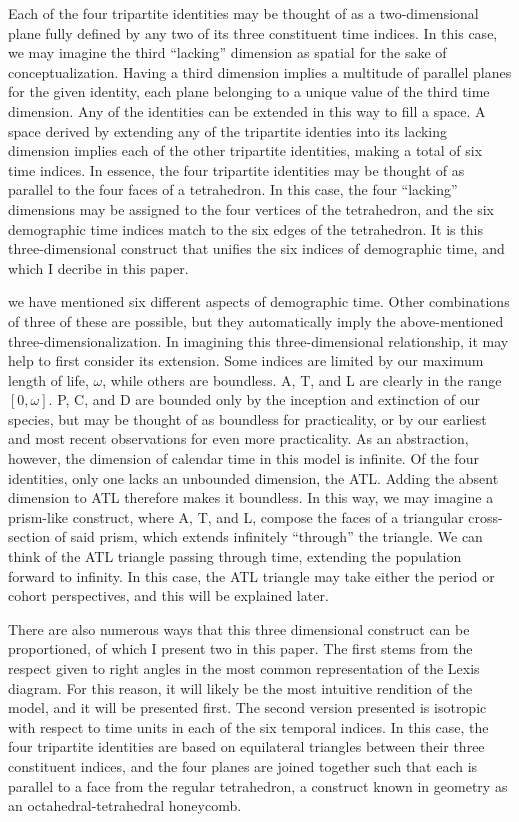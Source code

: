 \documentclass[11pt,oneside]{article} %
\begin{document}
Each of the four tripartite identities may be thought of as a
two-dimensional plane fully defined by any two of its three constituent time
indices.
In this case, we may imagine the third ``lacking'' dimension as spatial for the sake of conceptualization.
Having a third dimension implies a multitude of parallel planes for the given identity, each plane
belonging to a unique value of the third time dimension. Any of the
identities can be extended in this way to fill a space. A space derived by
extending any of the tripartite identies into its lacking dimension implies each of the
other tripartite identities, making a total of six time indices. In essence, the
four tripartite identities may be thought of as parallel to the four faces of a
tetrahedron. In this case, the four ``lacking'' dimensions may be assigned to
the four vertices of the tetrahedron, and the six demographic time indices match
to the six edges of the tetrahedron. It is this three-dimensional construct that
unifies the six indices of demographic time, and which I decribe in this
paper.

we have mentioned six different aspects of demographic time. Other combinations
of three of these are possible, but they automatically imply the above-mentioned
three-dimensionalization. In imagining this three-dimensional relationship,
it may help to first consider its extension. Some indices are limited
by our maximum length of life, $\omega$, while others are boundless. A, T, and L are clearly in the range $[0,\omega]$. P, C, and D are bounded only by the inception and extinction of our species, but may be
thought of as boundless for practicality, or by our earliest and most recent
observations for even more practicality. As an abstraction, however, the
dimension of calendar time in this model is infinite. Of the four identities,
only one lacks an unbounded dimension, the ATL. Adding the absent dimension to
ATL therefore makes it boundless. In this way, we may imagine a prism-like
construct, where A, T, and L, compose the faces of a triangular
cross-section of said prism, which extends infinitely ``through'' the triangle.
We can think of the ATL triangle passing through time, extending the population
forward to infinity. In this case, the ATL triangle may take either the period
or cohort perspectives, and this will be explained later. 

There are also
numerous ways that this three dimensional construct can be proportioned, of
which I present two in this paper. The first stems from the respect given to right angles in the most
common representation of the Lexis diagram. For this reason, it will likely be
the most intuitive rendition of the model, and it will be presented first. The
second version presented is isotropic with respect to time units in each of the
six temporal indices. In this case, the four tripartite identities are based on
equilateral triangles between their three constituent indices, and the four
planes are joined together such that each is parallel to a face from the regular
tetrahedron, a construct known in geometry as an octahedral-tetrahedral
honeycomb.
\end{document}
